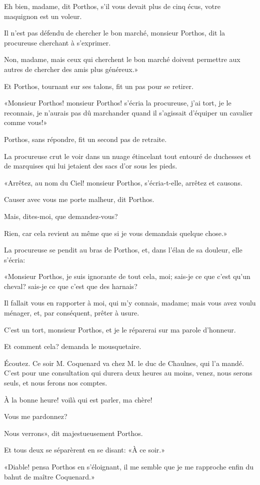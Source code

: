 \speak  Eh bien, madame, dit Porthos, s'il vous devait plus de cinq écus, votre maquignon est un voleur. 

\speak  Il n'est pas défendu de chercher le bon marché, monsieur Porthos, dit la procureuse cherchant à s'exprimer. 

\speak  Non, madame, mais ceux qui cherchent le bon marché doivent permettre aux autres de chercher des amis plus généreux.» 

Et Porthos, tournant sur ses talons, fit un pas pour se retirer. 

«Monsieur Porthos! monsieur Porthos! s'écria la procureuse, j'ai tort, je le reconnais, je n'aurais pas dû marchander quand il s'agissait d'équiper un cavalier comme vous!» 

Porthos, sans répondre, fit un second pas de retraite. 

La procureuse crut le voir dans un nuage étincelant tout entouré de duchesses et de marquises qui lui jetaient des sacs d'or sous les pieds. 

«Arrêtez, au nom du Ciel! monsieur Porthos, s'écria-t-elle, arrêtez et causons. 

\speak  Causer avec vous me porte malheur, dit Porthos. 

\speak  Mais, dites-moi, que demandez-vous? 

\speak  Rien, car cela revient au même que si je vous demandais quelque chose.» 

La procureuse se pendit au bras de Porthos, et, dans l'élan de sa douleur, elle s'écria: 

«Monsieur Porthos, je suis ignorante de tout cela, moi; sais-je ce que c'est qu'un cheval? sais-je ce que c'est que des harnais? 

\speak  Il fallait vous en rapporter à moi, qui m'y connais, madame; mais vous avez voulu ménager, et, par conséquent, prêter à usure. 

\speak  C'est un tort, monsieur Porthos, et je le réparerai sur ma parole d'honneur. 

\speak  Et comment cela? demanda le mousquetaire. 

\speak  Écoutez. Ce soir M. Coquenard va chez M. le duc de Chaulnes, qui l'a mandé. C'est pour une consultation qui durera deux heures au moins, venez, nous serons seuls, et nous ferons nos comptes. 

\speak  À la bonne heure! voilà qui est parler, ma chère! 

\speak  Vous me pardonnez? 

\speak  Nous verrons», dit majestueusement Porthos. 

Et tous deux se séparèrent en se disant: «À ce soir.» 

«Diable! pensa Porthos en s'éloignant, il me semble que je me rapproche enfin du bahut de maître Coquenard.» 